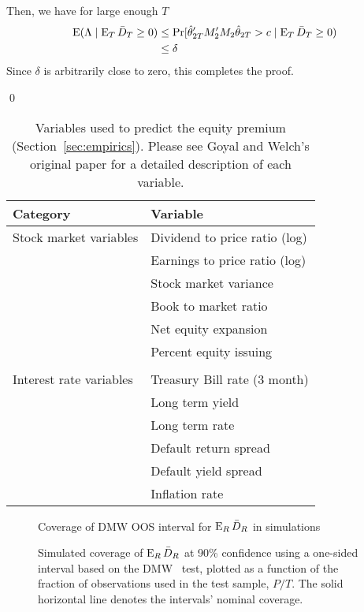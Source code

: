 \documentclass[12pt,draft]{article}
\begin{document}
Then, we have for large enough $T$
\begin{align*}
  \operatorname{E}(\Lambda \mid \operatorname{E}_T \bar{D}_{T} \geq 0) &\leq
  \Pr[\hat\theta_{2T}'M_2'M_2\hat\theta_{2T} > c \mid \operatorname{E}_T \bar{D}_{T} \geq 0) \\
  &\leq \delta
\end{align*}
Since $\delta$ is arbitrarily close to zero, this completes the proof.

\qed

\clearpage
\markboth{}{}

\begin{table}[tb]
  \begin{tabularx}{\linewidth}{XX}
    \toprule
    Category & Variable \\
    \midrule
    Stock market variables
    & Dividend to price ratio (log) \\
    & Earnings to price ratio (log) \\
    & Stock market variance \\
    & Book to market ratio \\
    & Net equity expansion \\
    & Percent equity issuing \\\\
    Interest rate variables
    & Treasury Bill rate (3 month) \\
    & Long term yield \\
    & Long term rate \\
    & Default return spread \\
    & Default yield spread \\
    & Inflation rate \\
    \bottomrule
  \end{tabularx}
  \caption{Variables used to predict the equity premium
    (Section~\ref{sec:empirics}).
    Please see Goyal and Welch's original paper \citep{GoW:08}
    for a detailed description of each variable.}
  \label{tab:equity}
\end{table}

\insamplecoefs
\insampletests

\begin{figure}\centering
  {\large Coverage of DMW OOS interval for $\operatorname{E}_R\bar{D}_{R}$ in simulations}
  \caption{Simulated coverage of $\operatorname{E}_R \bar{D}_{R}$ at 90\% confidence using
    a one-sided interval based on the DMW \oost\ test, plotted as a
    function of the fraction of observations used in the test sample,
    $P/T$. The solid horizontal line denotes the intervals' nominal
    coverage.}
 \label{fig:interval-R}
\end{figure}
\clearpage
\end{document}
